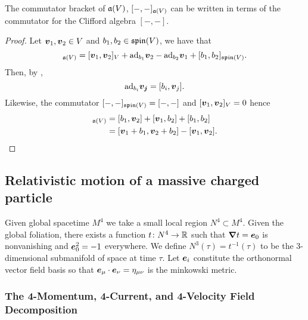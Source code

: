 \documentclass{article}
\begin{document}
\begin{proposition}
The commutator bracket of $\mathfrak{a}(V)$, $[-,-]_{\mathfrak{a}(V)}$ can be written in terms of the commutator for the Clifford algebra $[-,-]$.
\end{proposition}
\begin{proof}
Let $\boldsymbol{v}_1,\boldsymbol{v}_2\in V$ and $b_1,b_2 \in \mathfrak{spin}(V)$, we have that 
\begin{equation}
[\blade{v}_1+b_1,\blade{v}_2+b_2]_{\liealg(V)} = [\blade{v}_1,\blade{v}_2]_{V}+\mathrm{ad}_{b_1}\blade{v}_2 - \mathrm{ad}_{b_2}\blade{v}_1 + [b_1,b_2]_{\spina(V)}.
\end{equation}
Then, by \cite[Lemma 5.7]{gracia-bondia_elements_2001}, 
\begin{equation}
\mathrm{ad}_{b_i}\boldsymbol{v_j}=[b_i,\boldsymbol{v}_j].
\end{equation}
Likewise, the commutator $[-,-]_{\mathfrak{spin}(V)}=[-,-]$ and $[\boldsymbol{v}_1,\boldsymbol{v}_2]_V=0$ hence
\begin{align}
[\blade{v}_1 + b_1,\blade{v}_2+b_2]_{\liealg(V)} &= [b_1,\blade{v}_2] + [\blade{v}_1,b_2] + [b_1,b_2]\\
&= [\blade{v}_1+b_1,\blade{v}_2+b_2]-[\blade{v}_1,\blade{v}_2].
\end{align}
\end{proof}

\subsection{Relativistic motion of a massive charged particle}

Given global spacetime $M^4$ we take a small local region $N^4\subset M^4$. Given the global foliation, there exists a function $t \colon N^4 \to \mathbb{R}$ such that $\boldsymbol{\nabla} t = \boldsymbol{e}_0$ is nonvanishing and $\boldsymbol{e}_0^2=-1$ everywhere. We define $N^3(\tau)=t^{-1}(\tau)$ to be the 3-dimensional submanifold of space at time $\tau$. Let $\boldsymbol{e}_i$ constitute the orthonormal vector field basis so that $\boldsymbol{e}_\mu \cdot \boldsymbol{e}_\nu = \eta_{\mu \nu}$ is the minkowski metric. 

\subsubsection{The 4-Momentum, 4-Current, and 4-Velocity Field Decomposition}
\end{document}
